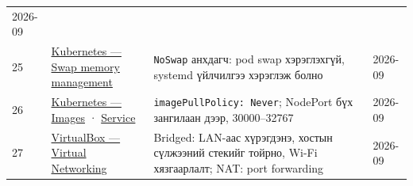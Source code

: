 \begin{longtable}[]{@{}llll@{}}
\begin{minipage}[t]{0.22\columnwidth}
2026-09\strut
\end{minipage}\tabularnewline
\begin{minipage}[t]{0.22\columnwidth}\raggedright
25\strut
\end{minipage} & \begin{minipage}[t]{0.22\columnwidth}\raggedright
\href{https://kubernetes.io/docs/concepts/cluster-administration/swap-memory-management/}{Kubernetes --- Swap memory management}\strut
\end{minipage} & \begin{minipage}[t]{0.22\columnwidth}\raggedright
\texttt{NoSwap} анхдагч: pod swap хэрэглэхгүй, systemd үйлчилгээ хэрэглэж болно\strut
\end{minipage} & \begin{minipage}[t]{0.22\columnwidth}\raggedright
2026-09\strut
\end{minipage}\tabularnewline
\begin{minipage}[t]{0.22\columnwidth}\raggedright
26\strut
\end{minipage} & \begin{minipage}[t]{0.22\columnwidth}\raggedright
\href{https://kubernetes.io/docs/concepts/containers/images/}{Kubernetes --- Images} · \href{https://kubernetes.io/docs/concepts/services-networking/service/}{Service}\strut
\end{minipage} & \begin{minipage}[t]{0.22\columnwidth}\raggedright
\texttt{imagePullPolicy:\allowbreak{}\ Never}; NodePort бүх зангилаан дээр, 30000--32767\strut
\end{minipage} & \begin{minipage}[t]{0.22\columnwidth}\raggedright
2026-09\strut
\end{minipage}\tabularnewline
\begin{minipage}[t]{0.22\columnwidth}\raggedright
27\strut
\end{minipage} & \begin{minipage}[t]{0.22\columnwidth}\raggedright
\href{https://www.virtualbox.org/manual/topics/networkingdetails.html}{VirtualBox --- Virtual Networking}\strut
\end{minipage} & \begin{minipage}[t]{0.22\columnwidth}\raggedright
Bridged: LAN-аас хүрэгдэнэ, хостын сүлжээний стекийг тойрно, Wi-Fi хязгаарлалт; NAT: port forwarding\strut
\end{minipage} & \begin{minipage}[t]{0.22\columnwidth}\raggedright
2026-09\strut
\end{minipage}\tabularnewline

\end{longtable}
